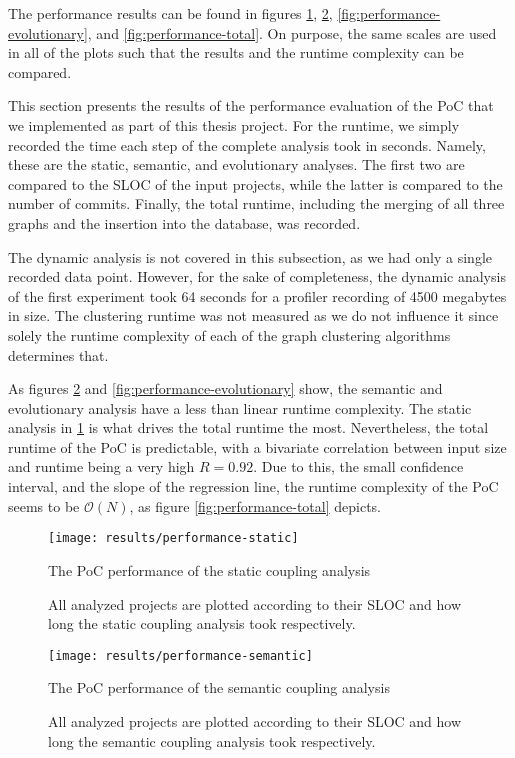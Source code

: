 \documentclass[12pt,a4paper]{report}
\begin{document}
The performance results can be found in figures \ref{fig:performance-static},
\ref{fig:performance-semantic}, \ref{fig:performance-evolutionary}, and
\ref{fig:performance-total}. On purpose, the same scales are used in all of the
plots such that the results and the runtime complexity can be compared.

This section presents the results of the performance evaluation of the PoC that
we implemented as part of this thesis project. For the runtime, we simply
recorded the time each step of the complete analysis took in seconds. Namely,
these are the static, semantic, and evolutionary analyses. The first two are
compared to the SLOC of the input projects, while the latter is compared to the
number of commits. Finally, the total runtime, including the merging of all
three graphs and the insertion into the database, was recorded.

The dynamic analysis is not covered in this subsection, as we had only a single
recorded data point. However, for the sake of completeness, the dynamic
analysis of the first experiment took 64 seconds for a profiler recording of
4500 megabytes in size. The clustering runtime was not measured as we do not
influence it since solely the runtime complexity of each of the graph
clustering algorithms determines that.

As figures \ref{fig:performance-semantic} and \ref{fig:performance-evolutionary}
show, the semantic and evolutionary analysis have a less than
linear runtime complexity. The static analysis in \ref{fig:performance-static}
is what drives the total runtime the most. Nevertheless, the total runtime of
the PoC is predictable, with a bivariate correlation between input size and
runtime being a very high \(R = 0.92\). Due to this, the small confidence
interval, and the slope of the regression line, the runtime complexity of the
PoC seems to be \(\mathcal{O}(N)\), as figure \ref{fig:performance-total}
depicts.

\begin{figure}[htbp]
\centering
\texttt{[image: results/performance-static]}
\caption{The PoC performance of the static coupling analysis}
\caption*{\centering
  All analyzed projects are plotted according to their SLOC
  and how long the static coupling analysis took respectively.
}
\label{fig:performance-static}
\end{figure}

\begin{figure}[htbp]
\centering
\texttt{[image: results/performance-semantic]}
\caption{The PoC performance of the semantic coupling analysis}
\caption*{\centering
  All analyzed projects are plotted according to their SLOC
  and how long the semantic coupling analysis took respectively.
}
\label{fig:performance-semantic}
\end{figure}
\end{document}
